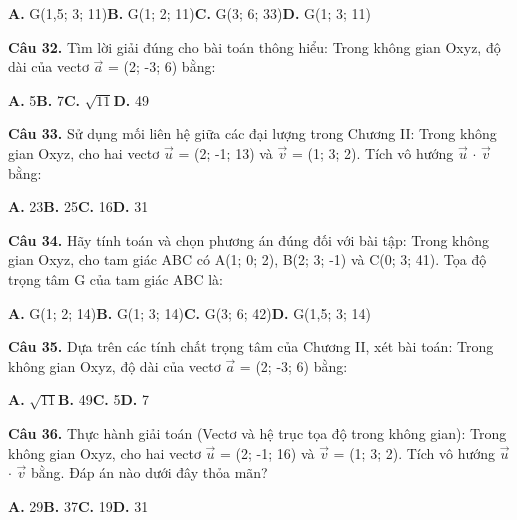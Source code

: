 \documentclass[11pt,a4paper]{article}
\begin{document}
\hspace*{1.5em}\textbf{A.} G(1,5; 3; 11)\quad\quad \textbf{B.} G(1; 2; 11)\quad\quad \textbf{C.} G(3; 6; 33)\quad\quad \textbf{D.} G(1; 3; 11)\par\vspace{2pt}
\textbf{\color{primary} Câu 32.} Tìm lời giải đúng cho bài toán thông hiểu: Trong không gian Oxyz, độ dài của vectơ $\vec{a}$ = (2; -3; 6) bằng:\par
\hspace*{1.5em}\textbf{A.} 5\quad\quad \textbf{B.} 7\quad\quad \textbf{C.} $\sqrt{11}$\quad\quad \textbf{D.} 49\par\vspace{2pt}
\textbf{\color{primary} Câu 33.} Sử dụng mối liên hệ giữa các đại lượng trong Chương II: Trong không gian Oxyz, cho hai vectơ $\vec{u}$ = (2; -1; 13) và $\vec{v}$ = (1; 3; 2). Tích vô hướng $\vec{u}$ $\cdot$ $\vec{v}$ bằng:\par
\hspace*{1.5em}\textbf{A.} 23\quad\quad \textbf{B.} 25\quad\quad \textbf{C.} 16\quad\quad \textbf{D.} 31\par\vspace{2pt}
\textbf{\color{primary} Câu 34.} Hãy tính toán và chọn phương án đúng đối với bài tập: Trong không gian Oxyz, cho tam giác ABC có A(1; 0; 2), B(2; 3; -1) và C(0; 3; 41). Tọa độ trọng tâm G của tam giác ABC là:\par
\hspace*{1.5em}\textbf{A.} G(1; 2; 14)\quad\quad \textbf{B.} G(1; 3; 14)\quad\quad \textbf{C.} G(3; 6; 42)\quad\quad \textbf{D.} G(1,5; 3; 14)\par\vspace{2pt}
\textbf{\color{primary} Câu 35.} Dựa trên các tính chất trọng tâm của Chương II, xét bài toán: Trong không gian Oxyz, độ dài của vectơ $\vec{a}$ = (2; -3; 6) bằng:\par
\hspace*{1.5em}\textbf{A.} $\sqrt{11}$\quad\quad \textbf{B.} 49\quad\quad \textbf{C.} 5\quad\quad \textbf{D.} 7\par\vspace{2pt}
\textbf{\color{primary} Câu 36.} Thực hành giải toán (Vectơ và hệ trục tọa độ trong không gian): Trong không gian Oxyz, cho hai vectơ $\vec{u}$ = (2; -1; 16) và $\vec{v}$ = (1; 3; 2). Tích vô hướng $\vec{u}$ $\cdot$ $\vec{v}$ bằng. Đáp án nào dưới đây thỏa mãn?\par
\hspace*{1.5em}\textbf{A.} 29\quad\quad \textbf{B.} 37\quad\quad \textbf{C.} 19\quad\quad \textbf{D.} 31\par\vspace{2pt}
\end{document}
